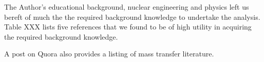The Author's educational background, nuclear engineering and physics left us bereft of much the the required background knowledge to undertake the analysis.  Table XXX lists five references that we found to be of high utility in acquiring the required background knowledge. 


A post on Quora also provides a listing of mass transfer literature. \cite{QuoraMass} 